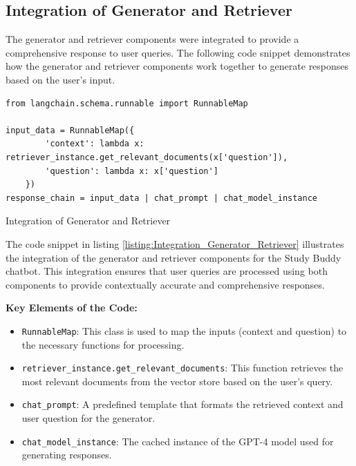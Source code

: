 \subsection{Integration of Generator and Retriever}
The generator and retriever components were integrated to provide a comprehensive response to user queries. The following code snippet demonstrates how the generator and retriever components work together to generate responses based on the user's input.

\begin{listing}[H]
\begin{verbatim}
from langchain.schema.runnable import RunnableMap

input_data = RunnableMap({
        'context': lambda x: retriever_instance.get_relevant_documents(x['question']),
        'question': lambda x: x['question']
    })
response_chain = input_data | chat_prompt | chat_model_instance
\end{verbatim}
\caption{Integration of Generator and Retriever}
\label{listing:Integration_Generator_Retriever}
\end{listing}

The code snippet in listing \ref{listing:Integration_Generator_Retriever} illustrates the integration of the generator and retriever components for the Study Buddy chatbot. This integration ensures that user queries are processed using both components to provide contextually accurate and comprehensive responses.

\textbf{Key Elements of the Code:}
\begin{itemize}
    \item \texttt{RunnableMap}: This class is used to map the inputs (context and question) to the necessary functions for processing.
    \item \texttt{retriever\_instance.get\_relevant\_documents}: This function retrieves the most relevant documents from the vector store based on the user's query.
    \item \texttt{chat\_prompt}: A predefined template that formats the retrieved context and user question for the generator.
    \item \texttt{chat\_model\_instance}: The cached instance of the GPT-4 model used for generating responses.
\end{itemize}

